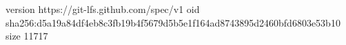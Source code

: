 version https://git-lfs.github.com/spec/v1
oid sha256:d5a19a84df4eb8c3fb19b4f5679d5b5e1f164ad8743895d2460bfd6803e53b10
size 11717
